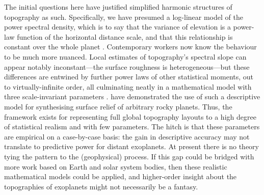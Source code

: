 \documentclass[trackchanges]{aastex63}
\begin{document}
The initial questions here have justified simplified harmonic structures of topography as such. Specifically, we have presumed a log-linear model of the power spectral density, which is to say that the variance of elevation is a power-law function of the horizontal distance scale, and that this relationship is constant over the whole planet \citep[as proposed in, e.g.,][]{turcotte_fractal_1987}. Contemporary workers now know the behaviour to be much more nuanced. Local estimates of topography's spectral slope can appear notably inconstant---the surface roughness is heterogeneous---but these differences are entwined by further power laws of other statistical moments, out to virtually-infinite order, all culminating neatly in a mathematical model with three scale-invariant parameters \citep[e.g.,][]{pelletier_self-organization_1999, gagnon_multifractal_2006, lovejoy_scaling_2007, ali_saberi_percolation_2013, liucci_fractal_2017, rak_universal_2018, landais_multifractal_2019, keylock_holder-conditioned_2020}. \citet{landais_topography_2019} have demonstrated the use of such a descriptive model for synthesising surface relief of arbitrary rocky planets. Thus, the framework exists for representing full global topography layouts to a high degree of statistical realism and with few parameters. The hitch is that these parameters are empirical on a case-by-case basis: the gain in descriptive accuracy may not translate to predictive power for distant exoplanets. At present there is no theory tying the pattern to the (geophysical) process. If this gap could be bridged with more work based on Earth and solar system bodies, then these realistic mathematical models could be applied, and higher-order insight about the topographies of exoplanets might not necessarily be a fantasy.



\end{document}
